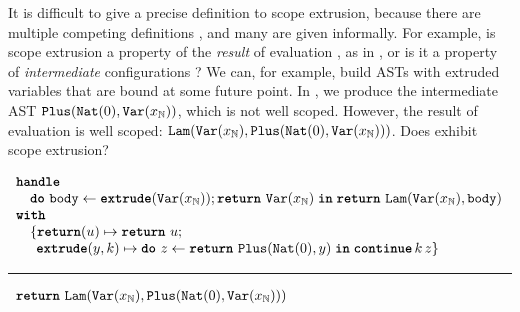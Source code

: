 It is difficult to give a precise definition to scope extrusion, because there are multiple competing definitions \citep{kiselyov-14,kiselyov-16}, and many are given informally. For example, is scope extrusion a property of the \textit{result} of evaluation \citep{kiselyov-16}, as in , or is it a property of \textit{intermediate} configurations \citep{kiselyov-14}? We can, for example, build ASTs with extruded variables that are bound at some future point. In , we produce the intermediate AST $\texttt{Plus}(\texttt{Nat}({0}), \texttt{Var}(x_{\mathbb{N}}))$, which is not well scoped. However, the result of evaluation is well scoped: $\texttt{Lam}(\texttt{Var}(x_{\mathbb{N}}), \texttt{Plus}(\texttt{Nat}({0}), \texttt{Var}(x_{\mathbb{N}})))$. Does  exhibit scope extrusion?


\begin{code}
  \begin{efflst}
    $\begin{array}{l}
      \textbf{\texttt{handle}} \\
      \quad \texttt{\textbf{do}} \,\, {\texttt{body}} \leftarrow {\textbf{\texttt{extrude}}({\texttt{Var}(x_{\mathbb{N}})}); \texttt{\textbf{return}} \,\, {\texttt{Var}(x_{\mathbb{N}})}} \; \textbf{\texttt{in}} \; {\texttt{\textbf{return}} \,\, {\texttt{Lam}(\texttt{Var}(x_{\mathbb{N}}), \texttt{body})}} \\
      \textbf{\texttt{with}} \\
      \quad \{ \textbf{\texttt{return}}(u) \mapsto \texttt{\textbf{return}} \,\, {u}; \\
      \quad \; \, \textbf{\texttt{extrude}}(y, k) \mapsto { \texttt{\textbf{do}} \,\, {z} \leftarrow {\texttt{\textbf{return}} \,\, {\texttt{Plus}({\texttt{Nat}({0})}, y)}} \; \textbf{\texttt{in}} \; {\textbf{\texttt{continue}} \, {k} \, {z}}} \}\\
    \end{array}$

    \vspace{2mm} 
\textcolor{effComment}{\hrule height 0.2mm \relax}
\vspace{2mm} 

\textcolor{effComment}{$\begin{array}{l}\texttt{\textbf{return}} \,\, {\texttt{Lam}(\texttt{Var}(x_{\mathbb{N}}), \texttt{Plus}(\texttt{Nat}({0}), \texttt{Var}(x_{\mathbb{N}})))}\end{array}$}

\end{efflst}
%
\label{listing:efflang-maybe-scope-extrusion}
\end{code}

